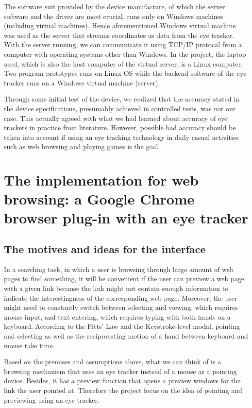 \documentclass[english]{tktltiki}
\begin{document}
The software suit provided by the device manufacture, of which the server software and the driver are most crucial, runs only on Windows machines (including virtual machines). Hence aforementioned Windows virtual machine was used as the server that streams coordinates as data from the eye tracker. With the server running, we can communicate it using TCP/IP protocal from a computer with operating systems other than Windows. In the project, the laptop used, which is also the host computer of the virtual server, is a Linux computer. Two program prototypes runs on Linux OS while the backend software of the eye tracker runs on a Windows virtual machine (server).

Through some initial test of the device, we realized that the accuracy stated in the device specifications, presumably achieved in controlled tests, was not our case. This actually agreed with what we had learned about accuracy of eye trackers in practice from literature. \cite{majaranta14} However, possible bad accuracy should be taken into account if using an eye tracking technology in daily casual activities such as web browsing and playing games is the goal. 


\section{The implementation for web browsing: a Google Chrome browser plug-in with an eye tracker}


\subsection{The motives and ideas for the interface}  

In a searching task, in which a user is browsing through large amount of web pages to find something, it will be convenient if the user can preview a web page with a given link because the link might not contain enough information to indicate the interestingness of the corresponding web page. Moreover, the user might need to constantly switch between selecting and viewing, which requires mouse input, and text entering, which requires typing with both hands on a keyboard. According to the Fitts' Law and the Keystroke-level modal,\cite{Fitts64}\cite{Card:1980:KMU:358886.358895} pointing and selecting as well as the reciprocating motion of a hand between keyboard and mouse take time. 

Based on the premises and assumptions above, what we can think of is a browsing mechanism that uses an eye tracker instead of a mouse as a pointing device. Besides, it has a preview function that opens a preview windows for the link the user pointed at. Therefore the project focus on the idea of pointing and previewing using an eye tracker.  
\end{document}
